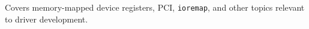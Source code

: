 Covers memory-mapped device registers, PCI, \texttt{ioremap}, and other
topics relevant to driver development.\\
